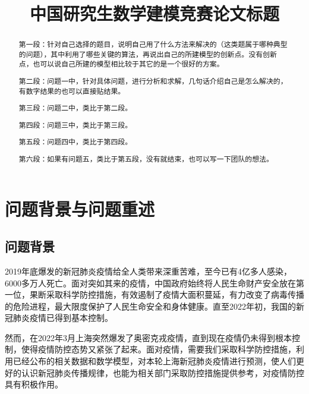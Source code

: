 \documentclass[bwprint]{gmcmthesis}
\title{中国研究生数学建模竞赛论文标题}
\numberwithin{figure}{section}
\begin{document}
 \maketitle
 \begin{abstract}
第一段：针对自己选择的题目，说明自己用了什么方法来解决的（这类题属于哪种典型的问题），其中利用了哪些关键的算法，再说出自己的所建模型的创新点。没有创新点，也可以说自己所建的模型相比较于其它的是一个很好的方案。

第二段：问题一中，针对具体问题，进行分析和求解，几句话介绍自己是怎么解决的，有数字结果的也可以直接贴结果。

第三段：问题二中，类比于第二段。

第四段：问题三中，类比于第三段。

第五段：问题四中，类比于第四段。

第六段：如果有问题五，类比于第五段，没有就结束，也可以写一下团队的想法。






\end{abstract}


\tableofcontents

\section{问题背景与问题重述}
\subsection{问题背景}
2019年底爆发的新冠肺炎疫情给全人类带来深重苦难，至今已有4亿多人感染，6000多万人死亡。面对突如其来的疫情，中国政府始终将人民生命财产安全放在第一位，果断采取科学防控措施，有效遏制了疫情大面积蔓延，有力改变了病毒传播的危险进程，最大限度保护了人民生命安全和身体健康。直至2022年初，我国的新冠肺炎疫情已得到基本控制。
\par 然而，在2022年3月上海突然爆发了奥密克戎疫情，直到现在疫情仍未得到根本控制，使得疫情防控态势又紧张了起来。面对疫情，需要我们采取科学防控措施，利用已经公布的相关数据和数学模型，对本轮上海新冠肺炎疫情进行预测，使人们更好的认识新冠肺炎传播规律，也能为相关部门采取防控措施提供参考，对疫情防控具有积极作用。
\end{document}
